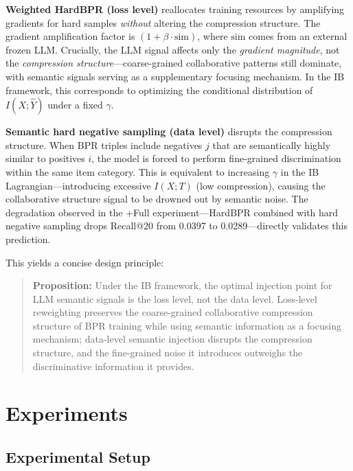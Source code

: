 \documentclass[11pt,a4paper]{article}
\begin{document}
\textbf{Weighted HardBPR (loss level)} reallocates training resources by amplifying gradients for hard samples \emph{without} altering the compression structure. The gradient amplification factor is $(1 + \beta \cdot \text{sim})$, where $\text{sim}$ comes from an external frozen LLM. Crucially, the LLM signal affects only the \emph{gradient magnitude}, not the \emph{compression structure}---coarse-grained collaborative patterns still dominate, with semantic signals serving as a supplementary focusing mechanism. In the IB framework, this corresponds to optimizing the conditional distribution of $I(X;\hat{Y})$ under a fixed $\gamma$.

\textbf{Semantic hard negative sampling (data level)} disrupts the compression structure. When BPR triples include negatives $j$ that are semantically highly similar to positives $i$, the model is forced to perform fine-grained discrimination within the same item category. This is equivalent to increasing $\gamma$ in the IB Lagrangian---introducing excessive $I(X;T)$ (low compression), causing the collaborative structure signal to be drowned out by semantic noise. The degradation observed in the +Full experiment---HardBPR combined with hard negative sampling drops Recall@20 from 0.0397 to 0.0289---directly validates this prediction.

This yields a concise design principle:
\begin{quote}
    \textbf{Proposition:} Under the IB framework, the optimal injection point for LLM semantic signals is the loss level, not the data level. Loss-level reweighting preserves the coarse-grained collaborative compression structure of BPR training while using semantic information as a focusing mechanism; data-level semantic injection disrupts the compression structure, and the fine-grained noise it introduces outweighs the discriminative information it provides.
\end{quote}

\section{Experiments}

\subsection{Experimental Setup}
\end{document}
